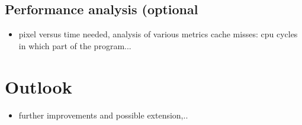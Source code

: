 \documentclass[7pt]{article}
\begin{document}
\begin{body}
\subsection{Performance analysis (optional}
\begin{itemize}
\item pixel versus time needed, analysis of various metrics cache misses: cpu cycles in which part of the program...
\end{itemize}



\section{Outlook}
\begin{itemize}
\item further improvements and possible extension,..
\end{itemize}

\end{body}
\end{document}
